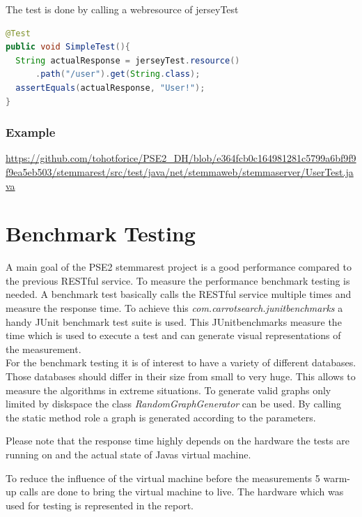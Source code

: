 \documentclass[11pt,fleqn,openany]{book} %
\begin{document}
The test is done by calling a webresource of jerseyTest
\begin{lstlisting}[language=java]
@Test
public void SimpleTest(){
  String actualResponse = jerseyTest.resource()
      .path("/user").get(String.class);
  assertEquals(actualResponse, "User!");
}
\end{lstlisting}

\subsection*{Example}
\url{https://github.com/tohotforice/PSE2_DH/blob/e364fcb0c164981281c5799a6bf9f9f9ea5eb503/stemmarest/src/test/java/net/stemmaweb/stemmaserver/UserTest.java}



\chapter{Benchmark Testing}

A main goal of the PSE2 stemmarest project is a good performance compared to the previous RESTful service. To measure the performance benchmark testing is needed. A benchmark test basically calls the RESTful service multiple times and measure the response time. To achieve this \textit{com.carrotsearch.junitbenchmarks} a handy JUnit benchmark test suite is used. This JUnitbenchmarks measure the time which is used to execute a test and can generate visual representations of the measurement.\\
For the benchmark testing it is of interest to have a variety of different databases. Those databases should differ in their size from small to very huge. This allows to measure the algorithms in extreme situations.
To generate valid graphs only limited by diskspace the class \textit{RandomGraphGenerator} can be used. By calling the static method role a graph is generated according to the parameters.\\
\begin{remark}
Please note that the response time highly depends on the hardware the tests are running on and the actual state of Javas virtual machine. 
\end{remark}
To reduce the influence of the virtual machine before the measurements 5 warm-up calls are done to bring the virtual machine to live. The hardware which was used for testing is represented in the report.
\end{document}
